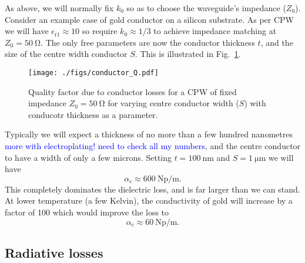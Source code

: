 \documentclass[a4paper]{article}
\newcommand{\cm}[1]{\textcolor{blue}{#1}} %
\begin{document}


As above, we will normally fix $k_0$ so as to choose the waveguide's impedance
($Z_0$). Consider an example case of gold conductor on a silicon substrate. As
per CPW\cite{1127105}  we will have $\epsilon_\mathrm{r1} \approx 10$ so require $k_0
\approx 1/3$ to achieve impedance matching at $Z_0 = \SI{50}{\ohm}$. The only
free parameters are now the conductor thickness $t$, and the size of the centre
width conductor $S$. This is illustrated in Fig.~\ref{fig:conductorQ}.

\begin{figure}
  \texttt{[image: ./figs/conductor\_Q.pdf]}
  \caption{Quality factor due to conductor losses for a CPW of fixed impedance
  $Z_0=\SI{50}{\ohm}$ for varying centre conductor width ($S$) with conducotr
  thickness as a parameter.}
  \label{fig:conductorQ}
\end{figure}

Typically we will expect a thickness of no more than a few hundred nanometres
\cm{more with electroplating! need to check all my numbers},
and the centre conductor to have a width of only a few microns. Setting
$t=\SI{100}{\nano\metre}$ and $S=\SI{1}{\micro\metre}$ we will have
\begin{equation}
  \alpha_c \approx \SI{600}{\neper \per \meter}.
\end{equation}
This completely dominates the dielectric loss, and is far larger than we can
stand. At lower temperature (a few Kelvin), the conductivity of gold will
increase by a factor of 100 which would improve the loss to
\begin{equation}
  \alpha_c \approx \SI{60}{\neper \per \meter}.
\end{equation}


\subsection{Radiative losses}
\end{document}
